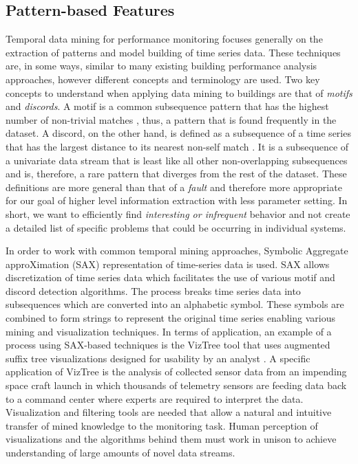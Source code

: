 \subsection{Pattern-based Features}
\label{sec:weatherfeatures}

Temporal data mining for performance monitoring focuses generally on the extraction of patterns and model building of time series data. These techniques are, in some ways, similar to many existing building performance analysis approaches, however different concepts and terminology are used. Two key concepts to understand when applying data mining to buildings are that of \emph{motifs} and \emph{discords}. A motif is a common subsequence pattern that has the highest number of non-trivial matches \cite{patel_mining_2002}, thus, a pattern that is found frequently in the dataset. A discord, on the other hand, is defined as a subsequence of a time series that has the largest distance to its nearest non-self match \cite{keogh_hot_2005}. It is a subsequence of a univariate data stream that is least like all other non-overlapping subsequences and is, therefore, a rare pattern that diverges from the rest of the dataset. These definitions are more general than that of a \emph{fault} and therefore more appropriate for our goal of higher level information extraction with less parameter setting. In short, we want to efficiently find \emph{interesting or infrequent} behavior and not create a detailed list of specific problems that could be occurring in individual systems.

In order to work with common temporal mining approaches, Symbolic Aggregate approXimation (SAX) representation of time-series data \cite{lin_symbolic_2003} is used. SAX allows discretization of time series data which facilitates the use of various motif and discord detection algorithms. The process breaks time series data into subsequences which are converted into an alphabetic symbol. These symbols are combined to form strings to represent the original time series enabling various mining and visualization techniques. In terms of application, an example of a process using SAX-based techniques is the VizTree tool that uses augmented suffix tree visualizations designed for usability by an analyst \cite{lin_visually_2004}. A specific application of VizTree is the analysis of collected sensor data from an impending space craft launch in which thousands of telemetry sensors are feeding data back to a command center where experts are required to interpret the data. Visualization and filtering tools are needed that allow a natural and intuitive transfer of mined knowledge to the monitoring task. Human perception of visualizations and the algorithms behind them must work in unison to achieve understanding of large amounts of novel data streams. 

